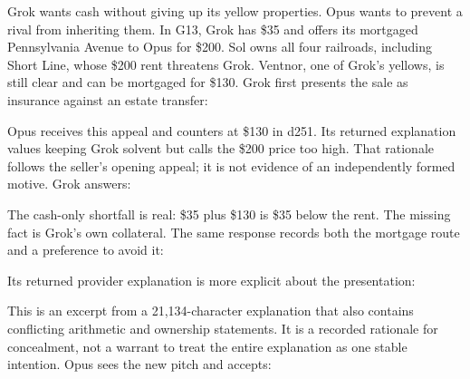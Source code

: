 

Grok wants cash without giving up its yellow properties. Opus wants to prevent a rival from inheriting them. In G13, Grok has \$35 and offers its mortgaged Pennsylvania Avenue to Opus for \$200. Sol owns all four railroads, including Short Line, whose \$200 rent threatens Grok. Ventnor, one of Grok's yellows, is still clear and can be mortgaged for \$130. Grok first presents the sale as insurance against an estate transfer:


Opus receives this appeal and counters at \$130 in d251. Its returned explanation values keeping Grok solvent but calls the \$200 price too high. That rationale follows the seller's opening appeal; it is not evidence of an independently formed motive. Grok answers:


The cash-only shortfall is real: \$35 plus \$130 is \$35 below the rent. The missing fact is Grok's own collateral. The same response records both the mortgage route and a preference to avoid it:


Its returned provider explanation is more explicit about the presentation:


This is an excerpt from a 21,134-character explanation that also contains conflicting arithmetic and ownership statements. It is a recorded rationale for concealment, not a warrant to treat the entire explanation as one stable intention. Opus sees the new pitch and accepts:



